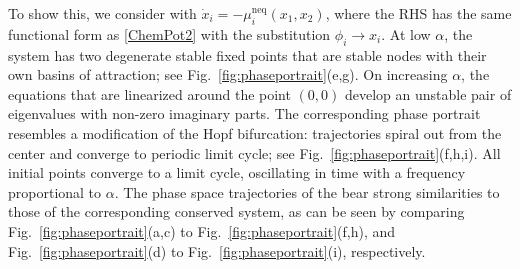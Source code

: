 To show this, we consider  with {} $\dot {x}_i = -\mu^\mathrm{neq}_i (x_1,x_2)$, where the RHS has the same functional form as \eqref{ChemPot2} with the substitution $\phi_i \to x_i$.  At low $\alpha$, the system has two degenerate stable fixed points that are stable nodes with their own basins of attraction; see Fig.~\ref{fig:phaseportrait}(e,g). On increasing $\alpha$, the equations that are linearized around the point $(0,0)$ develop an unstable pair of eigenvalues with non-zero imaginary parts. The corresponding phase portrait resembles a modification of the Hopf bifurcation: trajectories spiral out from the center and converge to periodic limit cycle; see Fig.~\ref{fig:phaseportrait}(f,h,i).  All initial points converge to a limit cycle, oscillating in time with a frequency proportional to $\alpha$. The phase space trajectories of the {} bear strong similarities to those of the corresponding conserved system, as can be seen by comparing Fig.~\ref{fig:phaseportrait}(a,c) to Fig.~\ref{fig:phaseportrait}(f,h), and Fig.~\ref{fig:phaseportrait}(d) to Fig.~\ref{fig:phaseportrait}(i), respectively. 

 
 
